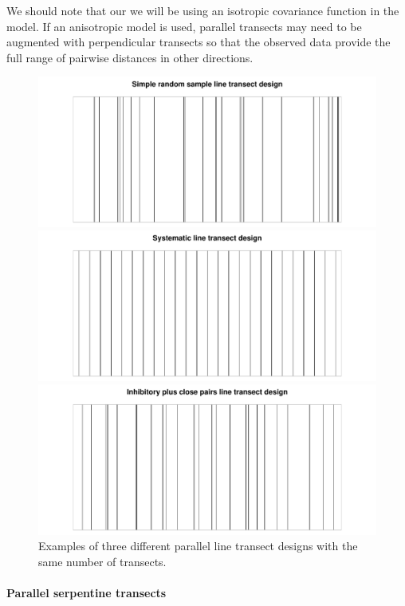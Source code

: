 \documentclass[review]{elsarticle}
\begin{document}
We should note that our we will be using an isotropic covariance function in
the model. If an anisotropic model is used, parallel transects may need to be
augmented with perpendicular transects so that the observed data provide the
full range of pairwise distances in other directions.

\begin{figure}
\includegraphics[width=5in]{SRS000176.pdf}

\includegraphics[width=5in]{Sys000141.pdf}

\includegraphics[width=5in]{Inhib000171.pdf}

\caption{Examples of three different parallel line transect designs with the
same number of transects.}
\label{linexsects}
\end{figure}

\paragraph{Parallel serpentine transects}
\end{document}
